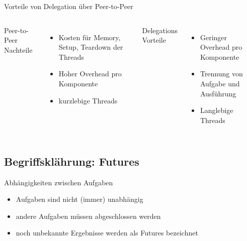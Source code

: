 \documentclass{beamer}
\begin{document}
\begin{frame}{Vorteile von Delegation \"uber Peer-to-Peer}

\begin{columns}
        Peer-to-Peer Nachteile
        
        \begin{itemize}
        \item Kosten f\"ur Memory, Setup, Teardown der Threads
        \item Hoher Overhead pro Komponente
        \item kurzlebige Threads
        \end{itemize}
        Delegations Vorteile
        \begin{itemize}
        \item Geringer Overhead pro Komponente
        \item Trennung von Aufgabe und Ausf\"uhrung
        \item Langlebige Threads
        \end{itemize}
    
\end{columns}
\end{frame}

\subsection{Begriffskl\"ahrung: Futures}

\begin{frame}{Abh\"angigkeiten zwischen Aufgaben}
\begin{itemize}
\item Aufgaben sind nicht (immer) unabh\"angig
\item andere Aufgaben m\"ussen abgeschlossen werden
\item noch unbekannte Ergebnisse werden als Futures bezeichnet
\end{itemize}
\end{frame}
\end{document}
